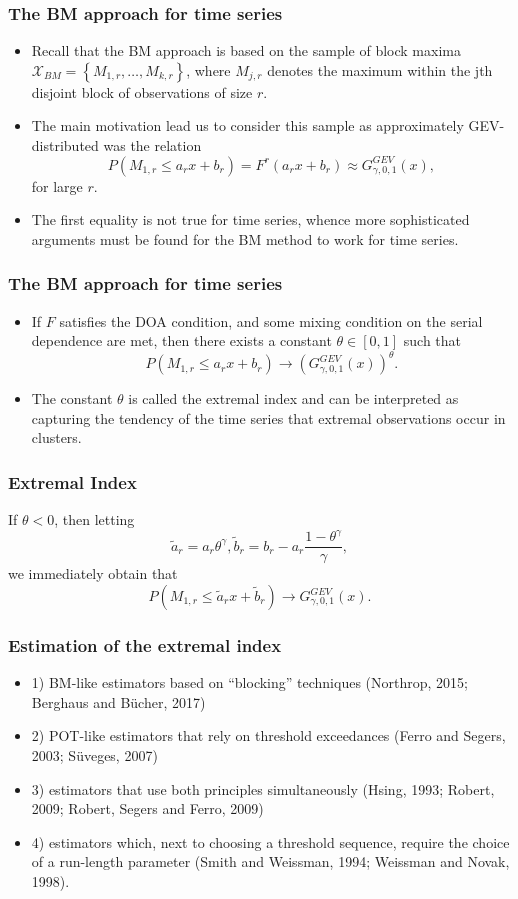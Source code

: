 \documentclass{beamer}
\newcommand{\suit}[1]{\left(#1\right)}
\newcommand{\set}[1]{\left\{#1\right\}}
\begin{document}
\begin{frame}
    \frametitle{The BM approach for time series}
\begin{itemize}
    \item Recall that the BM approach is based on the sample of block maxima $\mathcal{X}_{BM}=\set{M_{1,r},\dots,M_{k,r}}$, where $M_{j,r}$ denotes the maximum within the jth disjoint block of observations of size $r$.
    \item The main
    motivation lead us to consider this sample as approximately GEV-distributed   was the relation
    $$
P\suit{M_{1,r}\le a_r x+b_r}=F^r(a_r x+b_r)\approx G^{GEV}_{\gamma,0,1}(x),
    $$
    for large $r$. 
    \item The first equality is not true for time series, whence more sophisticated arguments
    must be found for the BM method to work for time series.
\end{itemize}
    

\end{frame}

\begin{frame}
    \frametitle{The BM approach for time series}
\begin{itemize}
    \item   If $F$ satisfies the DOA condition, and some mixing condition on the serial dependence are met, then there exists a constant $\theta \in[0,1]$ such that
    $$
    P\suit{M_{1,r}\le a_r x+b_r}\to\suit{G^{GEV}_{\gamma,0,1}(x)}^{\theta}.
    $$
     \item The constant $\theta$ is called the extremal index and can be interpreted as capturing the tendency of the time series that extremal observations occur in clusters.
\end{itemize}
    

\end{frame}


\begin{frame}
    \frametitle{Extremal Index}
If $\theta<0$, then letting
$$
\tilde{a}_r =a_r\theta^{\gamma}, \tilde{b}_r=b_r-a_r\frac{1-\theta^{\gamma}}{\gamma},
$$
we immediately obtain that
$$
P\suit{M_{1,r}\le \tilde{a}_r x+\tilde{b}_r}\to G^{GEV}_{\gamma,0,1}(x).
$$
\end{frame}

\begin{frame}
    \frametitle{Estimation of the extremal index}
\begin{itemize}
    \item 1) BM-like estimators based on “blocking”
    techniques (Northrop, 2015; Berghaus and Bücher, 2017)
    \item 2) POT-like estimators that rely on
    threshold exceedances (Ferro and Segers, 2003; Süveges, 2007)
    \item  3) estimators that use both principles simultaneously (Hsing, 1993; Robert, 2009; Robert, Segers and Ferro, 2009)
    \item 4) estimators which, next to choosing a threshold sequence, require the choice of a run-length parameter
    (Smith and Weissman, 1994; Weissman and Novak, 1998).
\end{itemize}
\end{frame}
\end{document}
